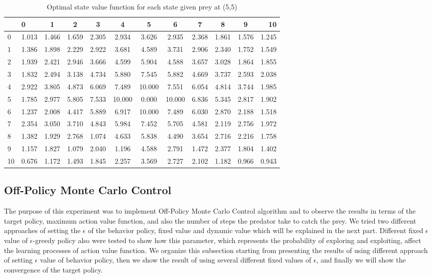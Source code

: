\documentclass[paper=a4, fontsize=11pt]{scrartcl}
\numberwithin{equation}{section}		%
\numberwithin{figure}{section}			%
\numberwithin{table}{section}				%
\begin{document}
\begin{table}[H]
\caption{Optimal state value function for each state given prey at (5,5)}
\centering
\begin{tabular}{l|l*{9}{c}r}
  \hline
 & 0 & 1 & 2 & 3 & 4 & 5 & 6 & 7 & 8 & 9 & 10 \\ \hline 
0&1.013 & 1.466 & 1.659 & 2.305 & 2.934 & 3.626 & 2.935 & 2.368 & 1.861 & 1.576 & 1.245 \\
1&1.386 & 1.898 & 2.229 & 2.922 & 3.681 & 4.589 & 3.731 & 2.906 & 2.340 & 1.752 & 1.549 \\
2&1.939 & 2.421 & 2.946 & 3.666 & 4.599 & 5.904 & 4.588 & 3.657 & 3.028 & 1.864 & 1.855 \\
3&1.832 & 2.494 & 3.138 & 4.734 & 5.880 & 7.545 & 5.882 & 4.669 & 3.737 & 2.593 & 2.038 \\
4&2.922 & 3.805 & 4.873 & 6.069 & 7.489 & 10.000 & 7.551 & 6.054 & 4.814 & 3.744 & 1.985\\ 
5&1.785 & 2.977 & 5.805 & 7.533 & 10.000 & 0.000 & 10.000 & 6.836 & 5.345 & 2.817 & 1.902 \\ 
6&1.237 & 2.008 & 4.417 & 5.889 & 6.917 & 10.000 & 7.489 & 6.030 & 2.870 & 2.188 & 1.518 \\
7&2.354 & 3.050 & 3.710 & 4.843 & 5.984 & 7.452 & 5.705 & 4.581 & 2.119 & 2.756 & 1.972 \\
8&1.382 & 1.929 & 2.768 & 1.074 & 4.633 & 5.838 & 4.490 & 3.654 & 2.716 & 2.216 & 1.758 \\
9&1.157 & 1.827 & 1.079 & 2.040 & 1.196 & 4.588 & 2.791 & 1.472 & 2.377 & 1.804 & 1.402 \\
10&0.676 & 1.172 & 1.493 & 1.845 & 2.257 & 3.569 & 2.727 & 2.102 & 1.182 & 0.966 & 0.943 
\end{tabular}
\label{table:valueFunctionOn}
\end{table}

\subsection{Off-Policy Monte Carlo Control}
The purpose of this experiment was to implement Off-Policy Monte Carlo Control algorithm and to observe the results in terms of the target policy, maximum action value function, and also the number of steps the predator take to catch the prey. We tried two different approaches of setting the $\epsilon$ of the behavior policy, fixed value and dynamic value which will be explained in the next part. Different fixed $\epsilon$ value of $\epsilon$-greedy policy also were tested to show how this parameter, which represents the probability of exploring and exploiting, affect the learning processes of action value function. We organize this subsection starting from presenting the results of using different approach of setting $\epsilon$ value of behavior policy, then we show the result of using several different fixed values of $\epsilon$, and finally we will show the convergence of the target policy. 
\end{document}
